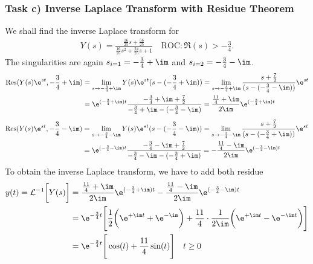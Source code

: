 \subsubsection{Task c) Inverse Laplace Transform with Residue Theorem}
We shall find the inverse Laplace transform for
\begin{align}
	Y(s) = \frac{\frac{16}{25}s+\frac{56}{25}}{\frac{16}{25}s^2+\frac{24}{25}s+1}
\quad \text{ROC}: \Re(s) > -\frac{3}{4}
	.
\end{align}
The singularities are again $s_{i=1}=-\frac{3}{4}+\im$ and $s_{i=2}=-\frac{3}{4}-\im$.
\begin{align}
	\mathrm{Res}(Y(s)\e^{st},-\frac{3}{4}+\im)&=\lim\limits_{s\rightarrow-\frac{3}{4}+\im}Y(s)\e^{st}(s-(-\frac{3}{4}+\im))=\lim\limits_{s\rightarrow-\frac{3}{4}+\im}\frac{s+\frac{7}{2}}{(s-(-\frac{3}{4}-\im))}\e^{st}\nonumber \\
	&=\e^{(-\frac{3}{4}+\im)t}\frac{-\frac{3}{4}+\im+\frac{7}{2}}{-\frac{3}{4}+\im-(-\frac{3}{4}-\im)}=\frac{\frac{11}{4}+\im}{2\im}\e^{(-\frac{3}{4}+\im)t}
\end{align}
\begin{align}
	\mathrm{Res}(Y(s)\e^{st},-\frac{3}{4}-\im)&=\lim\limits_{s\rightarrow-\frac{3}{4}-\im}Y(s)\e^{st}(s-(-\frac{3}{4}-\im))=\lim\limits_{s\rightarrow-\frac{3}{4}-\im}\frac{s+\frac{7}{2}}{(s-(-\frac{3}{4}+\im))}\e^{st}\nonumber \\
	&=\e^{(-\frac{3}{4}-\im)t}\frac{-\frac{3}{4}-\im+\frac{7}{2}}{-\frac{3}{4}-\im-(-\frac{3}{4}+\im)}=-\frac{\frac{11}{4}-\im}{2\im}\e^{(-\frac{3}{4}-\im)t}
\end{align}
To obtain the inverse Laplace transform, we have to add both residue
\begin{align}
	y(t)=\mathcal{L}^{-1}\bigg [Y(s)\bigg]&=\frac{\frac{11}{4}+\im}{2\im}\e^{(-\frac{3}{4}+\im)t}-\frac{\frac{11}{4}-\im}{2\im}\e^{(-\frac{3}{4}-\im)t}\nonumber \\
	&=\e^{-\frac{3}{4}t}\Bigg [\frac{1}{2}\bigg (\e^{+\im t}+\e^{-\im} \bigg )+\frac{11}{4}\cdot\frac{1}{2\im}\bigg (\e^{+\im t}-\e^{-\im t} \bigg )\Bigg ]\nonumber \\
	&= \e^{-\frac{3}{4}t}\Bigg [\cos(t)+\frac{11}{4}\sin(t)\Bigg ] \quad t \geq 0
\end{align}
